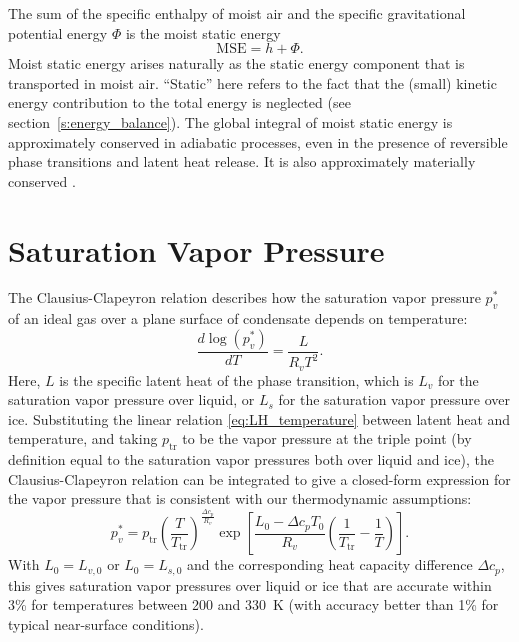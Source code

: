 \documentclass{report}
\begin{document}
The sum of the specific enthalpy of moist air and the specific gravitational potential energy $\Phi$ is the moist static energy \citep{Neelin87a}
\begin{equation}\label{e:MSE}
\mathrm{MSE} = h + \Phi.
\end{equation}
Moist static energy arises naturally as the static energy component that is transported in moist air. ``Static'' here refers to the fact that the (small) kinetic energy contribution to the total energy is neglected (see section~\ref{s:energy_balance}). The global integral of moist static energy is approximately conserved in adiabatic processes, even in the presence of reversible phase transitions and latent heat release. It is also approximately materially conserved \citep{Romps15b}. 

\section{Saturation Vapor Pressure}

The Clausius-Clapeyron relation describes how the saturation vapor pressure $p_v^*$ of an ideal gas over a plane surface of condensate depends on temperature:
\begin{equation}\label{e:Clausius_Clapeyron}
    \frac{d \log(p_v^*)}{dT} = \frac{L}{R_v T^2}.
\end{equation}
Here, $L$ is the specific latent heat of the phase transition, which is $L_v$ for the saturation vapor pressure over liquid, or $L_s$ for the saturation vapor pressure over ice. Substituting the linear relation \eqref{eq:LH_temperature} between latent heat and temperature, and taking $p_\mathrm{tr}$ to be the vapor pressure at the triple point (by definition equal to the saturation vapor pressures both over liquid and ice), the Clausius-Clapeyron relation can be integrated to give a closed-form expression for the vapor pressure that is consistent with our thermodynamic assumptions:
\begin{equation}
    p_v^* = p_{\mathrm{tr}} \left( \frac{T}{T_{\mathrm{tr}}} \right)^{\frac{\Delta c_p}{R_v}}
        \exp \left[ \frac{L_0 - \Delta c_p T_0}{R_v} 
        \left( \frac{1}{T_{\mathrm{tr}}} - \frac{1}{T} \right) \right].
        \label{eq:sat_vapor_pressure}
\end{equation}
With $L_0 = L_{v,0}$ or $L_0 = L_{s,0}$ and the corresponding heat capacity difference $\Delta c_p$, this gives saturation vapor pressures over liquid or ice that are accurate within 3\% for temperatures between 200 and 330~K (with accuracy better than 1\% for typical near-surface conditions).
\end{document}
